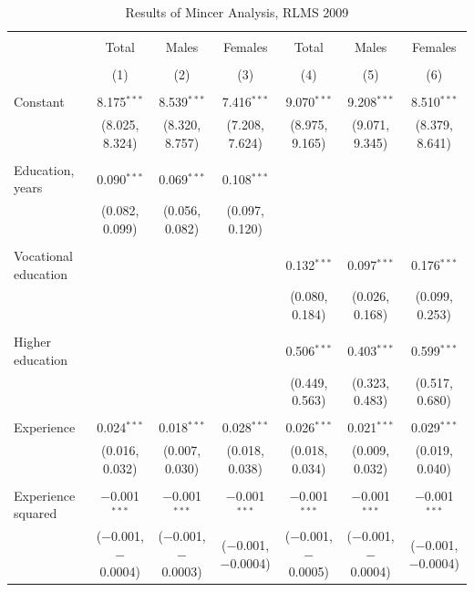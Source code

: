 \documentclass[12pt,a4paper]{article}
\numberwithin{equation}{section}
\begin{document}
\begin{landscape}
	
	\fontsize{9}{11}
	\selectfont
	
	\begin{table}[!htbp] \centering 
		\caption{Results of Mincer Analysis, RLMS 2009} 
		\label{} 
		\begin{tabular}{@{\extracolsep{5pt}}lcccccc} 
			\\[-1.8ex]\hline 
			\hline \\[-1.8ex] 
			& Total & Males & Females & Total & Males & Females \\ 
			\\[-1.8ex] & (1) & (2) & (3) & (4) & (5) & (6)\\ 
			\hline \\[-1.8ex] 
			Constant & 8.175$^{***}$ & 8.539$^{***}$ & 7.416$^{***}$ & 9.070$^{***}$ & 9.208$^{***}$ & 8.510$^{***}$ \\ 
			& (8.025, 8.324) & (8.320, 8.757) & (7.208, 7.624) & (8.975, 9.165) & (9.071, 9.345) & (8.379, 8.641) \\ 
			& & & & & & \\ 
			Education, years & 0.090$^{***}$ & 0.069$^{***}$ & 0.108$^{***}$ &  &  &  \\ 
			& (0.082, 0.099) & (0.056, 0.082) & (0.097, 0.120) &  &  &  \\ 
			& & & & & & \\ 
			Vocational education &  &  &  & 0.132$^{***}$ & 0.097$^{***}$ & 0.176$^{***}$ \\ 
			&  &  &  & (0.080, 0.184) & (0.026, 0.168) & (0.099, 0.253) \\ 
			& & & & & & \\ 
			Higher education &  &  &  & 0.506$^{***}$ & 0.403$^{***}$ & 0.599$^{***}$ \\ 
			&  &  &  & (0.449, 0.563) & (0.323, 0.483) & (0.517, 0.680) \\ 
			& & & & & & \\ 
			Experience & 0.024$^{***}$ & 0.018$^{***}$ & 0.028$^{***}$ & 0.026$^{***}$ & 0.021$^{***}$ & 0.029$^{***}$ \\ 
			& (0.016, 0.032) & (0.007, 0.030) & (0.018, 0.038) & (0.018, 0.034) & (0.009, 0.032) & (0.019, 0.040) \\ 
			& & & & & & \\ 
			Experience squared & $-$0.001$^{***}$ & $-$0.001$^{***}$ & $-$0.001$^{***}$ & $-$0.001$^{***}$ & $-$0.001$^{***}$ & $-$0.001$^{***}$ \\ 
			& ($-$0.001, $-$0.0004) & ($-$0.001, $-$0.0003) & ($-$0.001, $-$0.0004) & ($-$0.001, $-$0.0005) & ($-$0.001, $-$0.0004) & ($-$0.001, $-$0.0004) \\ 

\end{tabular}
\end{table}
\end{landscape}
\end{document}

